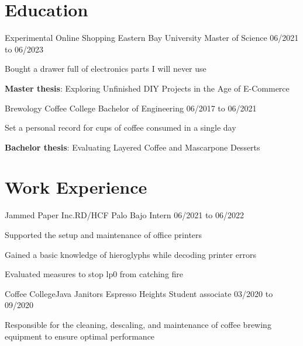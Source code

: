 %
%
%
%

\section{Education}
\begin{resumeList}  {Experimental Online Shopping}{}    {Eastern Bay University}
                    {Master of Science}                 {06/2021 to 06/2023}
    \item Bought a drawer full of electronics parts I will never use
    \item \textbf{Master thesis}: Exploring Unfinished DIY Projects in the Age of E-Commerce
\end{resumeList}
\begin{resumeList}  {Brewology}{}                {Coffee College}
                    {Bachelor of Engineering}    {06/2017 to 06/2021}
    \item Set a personal record for cups of coffee consumed in a single day
    \item \textbf{Bachelor thesis}: Evaluating Layered Coffee and Mascarpone Desserts
\end{resumeList}


\section{Work Experience}
\begin{resumeList}  {Jammed Paper Inc.}{RD/HCF}    {Palo Bajo}
                    {Intern}                       {06/2021 to 06/2022}
    \item Supported the setup and maintenance of office printers
    \item Gained a basic knowledge of hieroglyphs while decoding printer errors
    \item Evaluated measures to stop lp0 from catching fire
\end{resumeList}
\begin{resumeList}  {Coffee College}{Java Janitors}    {Espresso Heights}
                    {Student associate}                {03/2020 to 09/2020}
    \item Responsible for the cleaning, descaling, and maintenance of coffee brewing equipment to ensure optimal performance
\end{resumeList}


